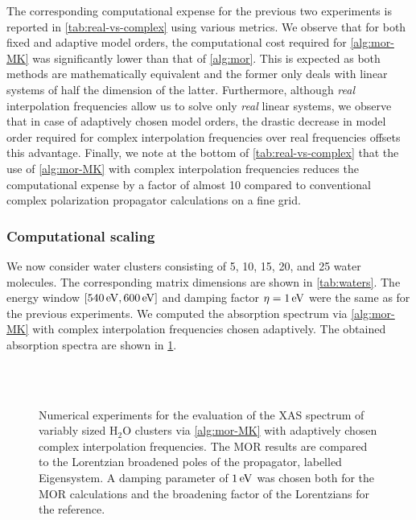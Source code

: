 The corresponding computational expense for the previous two experiments is reported in \cref{tab:real-vs-complex} using various metrics. We observe that for both fixed and adaptive model orders, the computational cost required for \cref{alg:mor-MK} was significantly lower than that of \cref{alg:mor}. This is expected as both methods are mathematically equivalent and the former only deals with linear systems of half the dimension of the latter. Furthermore, although \emph{real} interpolation frequencies allow us to solve only \emph{real} linear systems, we observe that in case of adaptively chosen model orders, the drastic decrease in model order required for complex interpolation frequencies over real frequencies offsets this advantage. Finally, we note at the bottom of \cref{tab:real-vs-complex} that the use of \cref{alg:mor-MK} with complex interpolation frequencies reduces the computational expense by a factor of almost 10 compared to conventional complex polarization propagator calculations on a fine grid.

\subsubsection{Computational scaling}
\label{sec:MORresults-scaling}

We now consider water clusters consisting of 5, 10, 15, 20, and 25 water molecules. The corresponding matrix dimensions are shown in \cref{tab:waters}. The energy window $[540\,\mathrm{eV},600\,\mathrm{eV}]$ and damping factor $\eta = 1\,\mathrm{eV}$ were the same as for the previous experiments. We computed the absorption spectrum via \cref{alg:mor-MK} with complex interpolation frequencies chosen adaptively. The obtained absorption spectra are shown in \cref{fig:water}.

\begin{figure}[hbtp]
\centering
{}%
%
\\[10pt]
%
%
%
\\[10pt]
\caption{Numerical experiments for the evaluation of the XAS spectrum of variably sized
H$_2$O clusters via \cref{alg:mor-MK} with adaptively chosen complex interpolation
frequencies. The MOR results are compared to the Lorentzian broadened poles of the
propagator, labelled Eigensystem. A damping parameter of $1\,\mathrm{eV}$ was chosen both
for the MOR calculations and the broadening factor of the Lorentzians for the
reference.}
\label{fig:water}
\end{figure}


